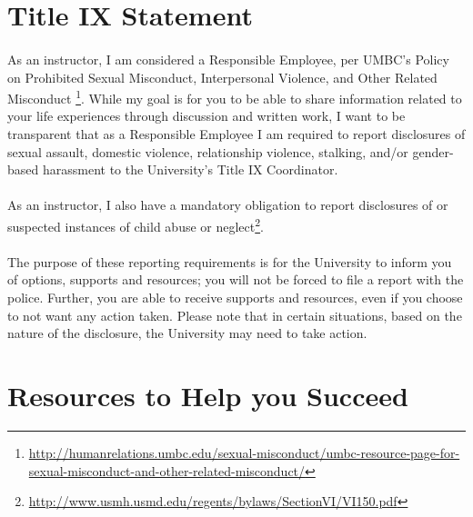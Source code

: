 \documentclass[letter,11pt]{article}
\begin{document}
\section*{Title IX Statement}
\paragraph{}As an instructor, I am considered a Responsible Employee, per UMBC’s Policy on Prohibited Sexual Misconduct, Interpersonal Violence, and Other Related Misconduct \footnote{\url{http://humanrelations.umbc.edu/sexual-misconduct/umbc-resource-page-for-sexual-misconduct-and-other-related-misconduct/}}. While my goal is for you to be able to share information related to your life experiences through discussion and written work, I want to be transparent that as a Responsible Employee I am required to report disclosures of sexual assault, domestic violence, relationship violence, stalking, and/or gender-based harassment to the University’s Title IX Coordinator.

\paragraph{}As an instructor, I also have a mandatory obligation to report disclosures of or suspected instances of child abuse or neglect\footnote{\url{http://www.usmh.usmd.edu/regents/bylaws/SectionVI/VI150.pdf}}.

\paragraph{}The purpose of these reporting requirements is for the University to inform you of options, supports and resources; you will not be forced to file a report with the police. Further, you are able to receive supports and resources, even if you choose to not want any action taken. Please note that in certain situations, based on the nature of the disclosure, the University may need to take action.

\section*{Resources to Help you Succeed}
\end{document}
